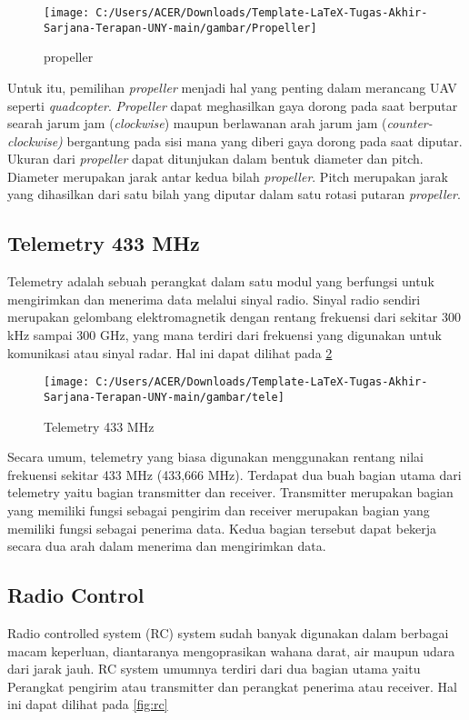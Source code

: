 \begin{figure}[H]
	\centering
	\texttt{[image: C:/Users/ACER/Downloads/Template-LaTeX-Tugas-Akhir-Sarjana-Terapan-UNY-main/gambar/Propeller]}
	\caption{propeller}
	\label{fig:propeller}
\end{figure}


Untuk itu, pemilihan \textit{propeller} menjadi hal yang penting dalam merancang UAV seperti \textit{quadcopter}. \textit{Propeller} dapat meghasilkan gaya dorong pada saat berputar searah jarum jam (\textit{clockwise}) maupun berlawanan arah jarum jam (\textit{counter-clockwise)} bergantung pada sisi mana yang diberi gaya dorong pada saat diputar. Ukuran dari \textit{propeller} dapat ditunjukan dalam bentuk diameter dan pitch. Diameter merupakan jarak antar kedua bilah \textit{propeller}. Pitch merupakan jarak yang dihasilkan dari satu bilah yang diputar dalam satu rotasi putaran \textit{propeller}. 

\subsection{Telemetry 433 MHz}
Telemetry adalah sebuah perangkat dalam satu modul yang berfungsi untuk mengirimkan dan menerima data melalui sinyal radio\cite{sirajuddin2023kendali}. Sinyal radio sendiri merupakan gelombang elektromagnetik dengan rentang frekuensi dari sekitar 300 kHz sampai 300 GHz, yang mana terdiri dari frekuensi yang digunakan untuk komunikasi atau sinyal radar. Hal ini dapat dilihat pada \cref{fig:tele}

\begin{figure}[H]
	\centering
	\texttt{[image: C:/Users/ACER/Downloads/Template-LaTeX-Tugas-Akhir-Sarjana-Terapan-UNY-main/gambar/tele]}
	\caption{Telemetry 433 MHz}
	\label{fig:tele}
\end{figure}

Secara umum, telemetry yang biasa digunakan menggunakan rentang nilai frekuensi sekitar 433 MHz (433,666 MHz). Terdapat dua buah bagian utama dari telemetry yaitu bagian transmitter dan receiver. Transmitter merupakan bagian yang memiliki fungsi sebagai pengirim dan receiver merupakan bagian yang memiliki fungsi sebagai penerima data. Kedua bagian tersebut dapat bekerja secara dua arah dalam menerima dan mengirimkan data. 

\subsection{Radio Control}
Radio controlled system (RC) system sudah banyak digunakan dalam berbagai macam keperluan, diantaranya mengoprasikan wahana darat, air maupun udara dari jarak jauh\cite{wu2024enterpris}. RC system umumnya terdiri dari dua bagian utama yaitu Perangkat pengirim atau transmitter dan perangkat penerima atau receiver. Hal ini dapat dilihat pada \cref{fig:rc}


